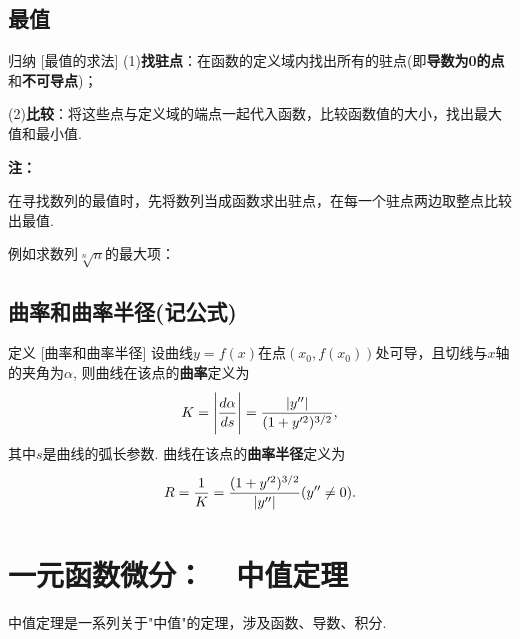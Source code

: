 \documentclass[a4paper,12pt,oneside,fontset=none]{ctexbook}
\let\olddfrac\dfrac
\renewcommand{\dfrac}[2]{
    \olddfrac{#1\vrule width 0pt height 1.15em depth 0em}{#2\vrule width 0pt height 0em depth 0.6em}
}
\let\oldlim\lim
\renewcommand{\lim}{\displaystyle\oldlim}
\newenvironment{induction}[1][]{\begin{thmBox}{归纳}{#1}}{\end{thmBox}}
\newcounter{definition}[chapter]
\newenvironment{definition}[1][]{\begin{defBox}{定义}{#1}}{\end{defBox}}
\newenvironment{note}{
    \par\vspace{0.5em}\noindent
    \textbf{\color{NoteColor} 注：}
}{
    \par\vspace{0.5em}
}
\numberwithin{equation}{chapter}
\begin{document}


\section{最值}
\begin{induction}
    [最值的求法]
    (1)\textbf{找驻点}：在函数的定义域内找出所有的驻点(即\textbf{导数为0的点}和\textbf{不可导点})；

    (2)\textbf{比较}：将这些点与定义域的端点一起代入函数，比较函数值的大小，找出最大值和最小值.
\end{induction}
\begin{note}
    在寻找数列的最值时，先将数列当成函数求出驻点，在每一个驻点两边取整点比较出最值.

    例如求数列${\sqrt[n]{n}}$的最大项：
\end{note}


\section{曲率和曲率半径(记公式)}
\begin{definition}
    [曲率和曲率半径]
    设曲线$y=f(x)$在点$(x_0, f(x_0))$处可导，且切线与$x$轴的夹角为$\alpha$, 则曲线在该点的\textbf{曲率}定义为
    \[
    K = \left|\dfrac{d\alpha}{ds}\right| = \dfrac{|y''|}{(1+y'^2)^{3/2}},
    \]
    其中$s$是曲线的弧长参数. 曲线在该点的\textbf{曲率半径}定义为
    \[
    R = \dfrac{1}{K} = \dfrac{(1+y'^2)^{3/2}}{|y''|}(y'' \neq 0).
    \]
\end{definition}



\chapter{一元函数微分：\ \ 中值定理}
中值定理是一系列关于"中值"的定理，涉及函数、导数、积分.
\end{document}
